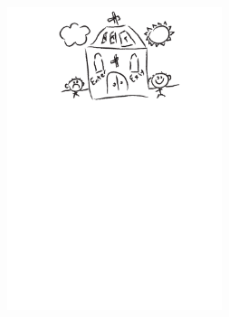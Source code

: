 \documentclass[twocolumn, aps, rmp, amsmath, amssymb, nofootinbib, superscriptaddress, longbibliography, floatfix, table-of-contents, eqsecnum]{revtex4-1}
\begin{document}






\begin{center}
	\includegraphics[width=0.47\textwidth]{sketch_final}
\end{center}
\end{document}

